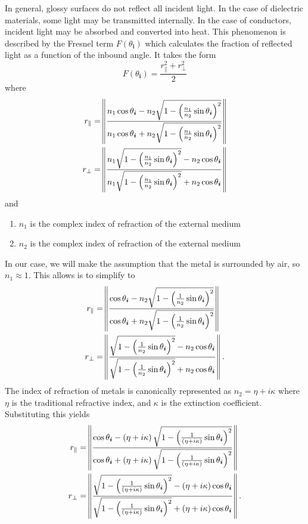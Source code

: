 \documentclass[12pt]{article}
\begin{document}
In general, glossy surfaces do not reflect all incident light.
In the case of dielectric materials, some light may be transmitted internally.
In the case of conductors, incident light may be absorbed and converted into heat.
This phenomenon is described by the Fresnel term \(F(\theta_{\bm i})\) which calculates the fraction of reflected light as a function of the inbound angle.
It takes the form
\[F(\theta_{\bm i}) = \frac{r_{\parallel}^2 + r_{\perp}^2}{2}\]
where
\begin{align*}
  r_{\parallel} &= \norm{\frac{n_1 \cos \theta_{\bm i} - n_2 \sqrt{1 - \del{\frac{n_1}{n_2}\sin \theta_{\bm i}}^2}}{n_1 \cos \theta_{\bm i} + n_2 \sqrt{1 - \del{\frac{n_1}{n_2}\sin \theta_{\bm i}}^2}}}\\
  r_{\perp} &= \norm{\frac{n_1 \sqrt{1 - \del{\frac{n_1}{n_2}\sin \theta_{\bm i}}^2} - n_2\cos \theta_{\bm i}}{n_1 \sqrt{1 - \del{\frac{n_1}{n_2}\sin \theta_{\bm i}}^2} + n_2 \cos \theta_{\bm i}}}
\end{align*}
and
\begin{enumerate}
\item \(n_1\) is the complex index of refraction of the external medium
\item \(n_2\) is the complex index of refraction of the external medium
\end{enumerate}
In our case, we will make the assumption that the metal is surrounded by air, so \(n_1 \approx 1\).
This allows is to simplify to
\begin{align*}
  r_{\parallel} &= \norm{\frac{\cos \theta_{\bm i} - n_2 \sqrt{1 - \del{\frac{1}{n_2}\sin \theta_{\bm i}}^2}}{\cos \theta_{\bm i} + n_2 \sqrt{1 - \del{\frac{1}{n_2}\sin \theta_{\bm i}}^2}}}\\
  r_{\perp} &= \norm{\frac{\sqrt{1 - \del{\frac{1}{n_2}\sin \theta_{\bm i}}^2} - n_2\cos \theta_{\bm i}}{\sqrt{1 - \del{\frac{1}{n_2}\sin \theta_{\bm i}}^2} + n_2 \cos \theta_{\bm i}}}.
\end{align*}
The index of refraction of metals is canonically represented as \(n_2 = \eta + i\kappa\) where \(\eta\) is the traditional refractive index, and \(\kappa\) is the extinction coefficient.
Substituting this yields
\begin{align*}
  r_{\parallel} &= \norm{\frac{\cos \theta_{\bm i} - \del{\eta + i\kappa} \sqrt{1 - \del{\frac{1}{\del{\eta + i\kappa}}\sin \theta_{\bm i}}^2}}{\cos \theta_{\bm i} + \del{\eta + i\kappa} \sqrt{1 - \del{\frac{1}{\del{\eta + i\kappa}}\sin \theta_{\bm i}}^2}}}\\
  r_{\perp} &= \norm{\frac{\sqrt{1 - \del{\frac{1}{\del{\eta + i\kappa}}\sin \theta_{\bm i}}^2} - \del{\eta + i\kappa}\cos \theta_{\bm i}}{\sqrt{1 - \del{\frac{1}{\del{\eta + i\kappa}}\sin \theta_{\bm i}}^2} + \del{\eta + i\kappa} \cos \theta_{\bm i}}}.
\end{align*}
\end{document}
